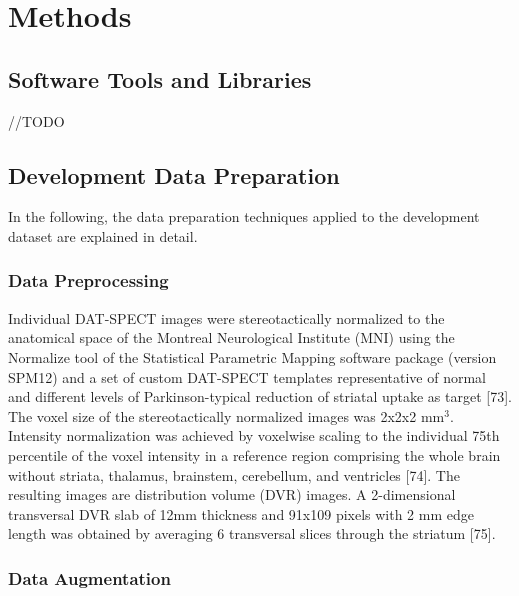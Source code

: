 \section{Methods}
\label{sec:methods}

\subsection{Software Tools and Libraries}
\label{subsec:libs}

//TODO

\subsection{Development Data Preparation}

In the following, the data preparation techniques applied to the development dataset are explained in detail.

\subsubsection{Data Preprocessing}
\label{subsubsec:img_preprocess_dev}



Individual DAT-SPECT images were stereotactically normalized to the anatomical space of the Montreal Neurological Institute (MNI) 
using the Normalize tool of the Statistical Parametric Mapping software package (version SPM12) and a set of custom DAT-SPECT templates 
representative of normal and different levels of Parkinson-typical reduction of striatal uptake as target [73]. 
The voxel size of the stereotactically normalized images was 2x2x2 mm$^{3}$. 
Intensity normalization was achieved by voxelwise scaling to the individual 75th percentile of the voxel intensity in a reference region 
comprising the whole brain without striata, thalamus, brainstem, cerebellum, and ventricles [74]. 
The resulting images are distribution volume (DVR) images. 
A 2-dimensional transversal DVR slab of 12mm thickness and 91x109 pixels with 2 mm edge length was obtained by averaging 6 transversal slices through the striatum [75]. 

\subsubsection{Data Augmentation}
\label{subsec:augment}

